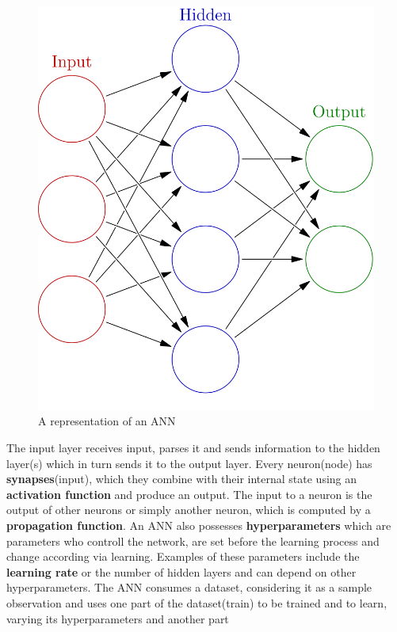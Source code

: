 \documentclass{scrartcl}
\begin{document}
    \begin{figure}[h!]
        \centering
        \includegraphics[scale=0.2]{ann.png}
        \caption{A representation of an ANN}
    \end{figure}
    The input layer receives input, parses it and sends information to the hidden layer(s) which
    in turn sends it to the output layer. Every neuron(node) has \textbf{synapses}(input), 
    which they combine with their internal state using an \textbf{activation function} and produce
    an output. The input to a neuron is the output of other neurons or simply another neuron,
    which is computed by a \textbf{propagation function}.
    An ANN also possesses \textbf{hyperparameters} which are parameters who controll the network,
    are set before the learning process and change according via learning. Examples of these 
    parameters include the \textbf{learning rate} or the number of hidden layers and can depend
    on other hyperparameters. \newline
    The ANN consumes a dataset, considering it as a sample observation and uses one part of 
    the dataset(train) to be trained and to learn, varying its hyperparameters and another part 
\end{document}

